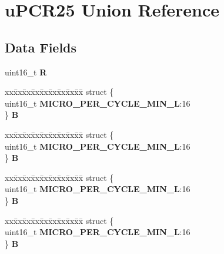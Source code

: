 \hypertarget{unionuPCR25}{}\section{u\+P\+C\+R25 Union Reference}
\label{unionuPCR25}
\subsection*{Data Fields}
\begin{DoxyCompactItemize}
\item 
\mbox{\label{unionuPCR25_a1fd77607da12290040aa6a7bf221227b}} 
uint16\+\_\+t {\bfseries R}
\item 
\mbox{\label{unionuPCR25_a4ea3790ade2ceda7d1f2e617bda8c424}} 
\begin{tabbing}
xx\=xx\=xx\=xx\=xx\=xx\=xx\=xx\=xx\=\kill
struct \{\\
\>uint16\_t {\bfseries MICRO\_PER\_CYCLE\_MIN\_L}:16\\
\} {\bfseries B}\\

\end{tabbing}\item 
\mbox{\label{unionuPCR25_a1a5f2b19ad6212ecbacbd0906a8c9e92}} 
\begin{tabbing}
xx\=xx\=xx\=xx\=xx\=xx\=xx\=xx\=xx\=\kill
struct \{\\
\>uint16\_t {\bfseries MICRO\_PER\_CYCLE\_MIN\_L}:16\\
\} {\bfseries B}\\

\end{tabbing}\item 
\mbox{\label{unionuPCR25_aca0ff616f83acf709e1f748f405444dc}} 
\begin{tabbing}
xx\=xx\=xx\=xx\=xx\=xx\=xx\=xx\=xx\=\kill
struct \{\\
\>uint16\_t {\bfseries MICRO\_PER\_CYCLE\_MIN\_L}:16\\
\} {\bfseries B}\\

\end{tabbing}\item 
\mbox{\label{unionuPCR25_acd861beb20cb1d39ea0e032b87c1b9da}} 
\begin{tabbing}
xx\=xx\=xx\=xx\=xx\=xx\=xx\=xx\=xx\=\kill
struct \{\\
\>uint16\_t {\bfseries MICRO\_PER\_CYCLE\_MIN\_L}:16\\
\} {\bfseries B}\\

\end{tabbing}\end{DoxyCompactItemize}


